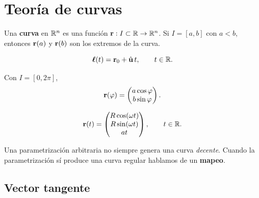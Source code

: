 \section{Teor\'ia de curvas}
\label{sec:teoria_curvas}

\begin{definicion}[Curva]
  \label{def:curva}
  Una \textbf{curva} en $\mathbb{R}^n$ es una funci\'on
  $\mathbf{r}:I\subset\mathbb{R}\rightarrow\mathbb{R}^n$. Si $I=[a,b]$ con $a<b$, entonces
  $\mathbf{r}(a)$ y $\mathbf{r}(b)$ son los extremos de la curva.
\end{definicion}

\begin{ejemplo}[Recta]
  \label{ej:recta}
  \begin{equation}
    \label{eq:recta}
    \boldsymbol{\ell}(t)=\mathbf{r}_0+\hat{\mathbf{u}}\,t,
    \qquad t\in\mathbb{R} .
  \end{equation}
\end{ejemplo}

\begin{ejemplo}[Elipse]
  \label{ej:elipse}
  Con $I=[0,2\pi]$,
  \begin{equation}
    \label{eq:elipse}
    \mathbf{r}(\varphi)=
    \begin{pmatrix}
      a\cos\varphi\\
      b\sin\varphi
    \end{pmatrix}.
  \end{equation}
\end{ejemplo}

\begin{ejemplo}[H\'elice]
  \label{ej:helice}
  \begin{equation}
    \label{eq:helice}
    \mathbf{r}(t)=
    \begin{pmatrix}
      R\cos(\omega t)\\
      R\sin(\omega t)\\
      a t
    \end{pmatrix},
    \qquad t\in\mathbb{R} .
  \end{equation}
\end{ejemplo}

\begin{observacion}
  Una parametrizaci\'on arbitraria no siempre genera una curva
  \emph{decente}. Cuando la parametrizaci\'on s\'i produce una curva regular
  hablamos de un \textbf{mapeo}.
\end{observacion}

\subsection{Vector tangente}
\label{subsec:vector_tangente}

